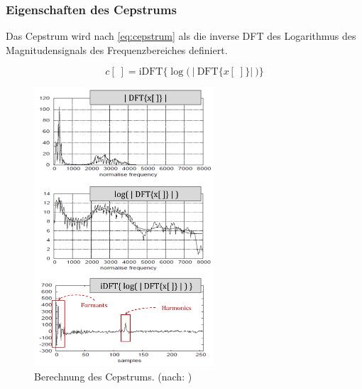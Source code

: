 \subsubsection{Eigenschaften des Cepstrums}
\label{sec:vad_ceps_features}

Das Cepstrum wird nach \autoref{eq:cepstrum} als die inverse DFT des Logarithmus des Magnitudensignals des Frequenzbereiches definiert.\cite[\emph{Cepstral Analysis}, S. 2]{ricardo_ceps}

\begin{equation}
c[\;] =  \text{iDFT}\Big\{ \log \Big(\ \big|\ \text{DFT}\{x[\;]\} \big|\ \Big) \Big\}
\label{eq:cepstrum}
\end{equation}	

\begin{figure}[H]
	\centering
	\includegraphics[width=0.6\textwidth]{bilder/cepstrum04.png}
	\caption[Berechnung des Cepstrums]{Berechnung des Cepstrums. (nach: \cite[\emph{Cepstral Analysis}, S. 3]{ricardo_ceps})}
	\label{img:cepstrumOverview}
\end{figure}

